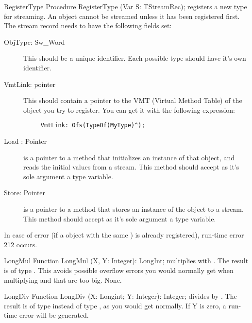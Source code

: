 \begin{procedure}{RegisterType}
\Declaration
Procedure RegisterType (Var S: TStreamRec);
\Description
{} registers a new type for streaming. An object cannot
be streamed unless it has been registered first. 
The stream record  needs to have the following fields set:

\begin{description}
\item[ObjType: Sw\_Word] This should be a unique identifier. Each possible
type should have it's own identifier. 
\item[VmtLink: pointer] This should contain a pointer to the VMT (Virtual
Method Table) of the object you try to register. You can get it with the
following expression:
\begin{verbatim}
     VmtLink: Ofs(TypeOf(MyType)^);
\end{verbatim}
\item[Load : Pointer] is a pointer to a method that initializes an instance
of that object, and reads the initial values from a stream. This method
should accept as it's sole argument a  type variable.
\item[Store: Pointer]is a pointer to a method that stores an instance of the
object to a stream. This method should accept as it's sole argument
 a  type variable.
\end{description}
\Errors
In case of error (if a object with the same ) is already
registered), run-time error 212 occurs.
\end{procedure}

\html{}

\begin{function}{LongMul}
\Declaration
Function LongMul (X, Y: Integer): LongInt;
\Description
{} multiplies  with . The result is of
type . This avoids possible overflow errors you would normally
get when multiplying  and  that are too big.
\Errors
None.
\SeeAlso
{}
\end{function}

\begin{function}{LongDiv}
\Declaration
Function LongDiv (X: Longint; Y: Integer): Integer;
\Description
{} divides  by . The result is of
type  instead of type , as you would get 
normally. 
\Errors
If Y is zero, a run-time error will be generated.
\SeeAlso
{}
\end{function}

